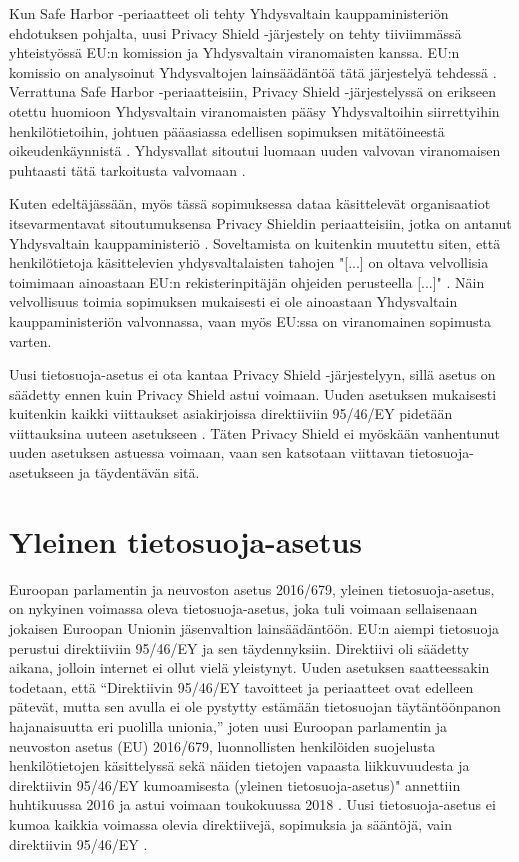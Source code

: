 \documentclass[finnish]{tktltiki}
\begin{document}
Kun Safe Harbor -periaatteet oli tehty Yhdysvaltain kauppaministeriön ehdotuksen pohjalta, uusi Privacy Shield -järjestely on tehty tiiviimmässä yhteistyössä EU:n komission ja Yhdysvaltain viranomaisten kanssa. EU:n komissio on analysoinut Yhdysvaltojen lainsäädäntöä tätä järjestelyä tehdessä \cite{privacy}. Verrattuna Safe Harbor -periaatteisiin, Privacy Shield -järjestelyssä on erikseen otettu huomioon Yhdysvaltain viranomaisten pääsy Yhdysvaltoihin siirrettyihin henkilötietoihin, johtuen pääasiassa edellisen sopimuksen mitätöineestä oikeudenkäynnistä \cite{privacy,tikkinen}. Yhdysvallat sitoutui luomaan uuden valvovan viranomaisen puhtaasti tätä tarkoitusta valvomaan \cite{safeharbor}.

Kuten edeltäjässään, myös tässä sopimuksessa dataa käsittelevät organisaatiot itsevarmentavat sitoutumuksensa Privacy Shieldin periaatteisiin, jotka on antanut Yhdysvaltain kauppaministeriö \cite{privacy}. Soveltamista on kuitenkin muutettu siten, että henkilötietoja käsittelevien yhdysvaltalaisten tahojen "[...] on oltava velvollisia toimimaan ainoastaan EU:n rekisterinpitäjän ohjeiden perusteella [...]" \cite{privacy}. Näin velvollisuus toimia sopimuksen mukaisesti ei ole ainoastaan Yhdysvaltain kauppaministeriön valvonnassa, vaan myös EU:ssa on viranomainen sopimusta varten.

Uusi tietosuoja-asetus ei ota kantaa Privacy Shield -järjestelyyn, sillä asetus on säädetty ennen kuin Privacy Shield astui voimaan. Uuden asetuksen mukaisesti kuitenkin kaikki viittaukset asiakirjoissa direktiiviin 95/46/EY pidetään viittauksina uuteen asetukseen \cite{eu2016}. Täten Privacy Shield ei myöskään vanhentunut uuden asetuksen astuessa voimaan, vaan sen katsotaan viittavan tietosuoja-asetukseen ja täydentävän sitä.

\newpage
\section{Yleinen tietosuoja-asetus}

Euroopan parlamentin ja neuvoston asetus 2016/679, yleinen tietosuoja-asetus, on nykyinen voimassa oleva tietosuoja-asetus, joka tuli voimaan sellaisenaan jokaisen Euroopan Unionin jäsenvaltion lainsäädäntöön. EU:n aiempi tietosuoja perustui direktiiviin 95/46/EY ja sen täydennyksiin. Direktiivi oli säädetty aikana, jolloin internet ei ollut vielä yleistynyt. Uuden asetuksen saatteessakin todetaan, että “Direktiivin 95/46/EY tavoitteet ja periaatteet ovat edelleen pätevät, mutta sen avulla ei ole pystytty estämään tietosuojan täytäntöönpanon hajanaisuutta eri puolilla unionia,” \cite{eu2016} joten uusi Euroopan parlamentin ja neuvoston asetus (EU) 2016/679, luonnollisten henkilöiden suojelusta henkilötietojen käsittelyssä sekä näiden tietojen vapaasta liikkuvuudesta ja direktiivin 95/46/EY kumoamisesta (yleinen tietosuoja-asetus)" annettiin huhtikuussa 2016 ja astui voimaan toukokuussa 2018 \cite{eu2016}. Uusi tietosuoja-asetus ei kumoa kaikkia voimassa olevia direktiivejä, sopimuksia ja sääntöjä, vain direktiivin 95/46/EY \cite{eu2016}.
\end{document}
